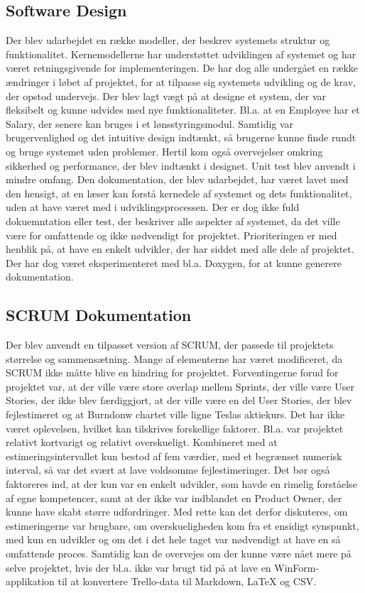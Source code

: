 \subsection{Software Design}
Der blev udarbejdet en række modeller, der beskrev systemets struktur og funktionalitet. Kernemodellerne har understøttet udviklingen af systemet og har været retningsgivende for implementeringen.
De har dog alle undergået en række ændringer i løbet af projektet, for at tilpasse sig systemets udvikling og de krav, der opstod undervejs.
Der blev lagt vægt på at designe et system, der var fleksibelt og kunne udvides med nye funktionaliteter. Bl.a. at en Employee har et Salary, der senere kan bruges i et lønsstyringsmodul.
Samtidig var brugervenlighed og det intuitive design indtænkt, så brugerne kunne finde rundt og bruge systemet uden problemer.
Hertil kom også overvejelser omkring sikkerhed og performance, der blev indtænkt i designet. Unit test blev anvendt i mindre omfang.
Den dokumentation, der blev udarbejdet, har været lavet med den hensigt, at en læser kan forstå kernedele af systemet og dets funktionalitet, uden at have været med i udviklingsprocessen.
Der er dog ikke fuld dokuemntation eller test, der beskriver alle aspekter af systemet, da det ville være for omfattende og ikke nødvendigt for projektet.
Prioriteringen er med henblik på, at have en enkelt udvikler, der har siddet med alle dele af projektet.
Der har dog været eksperimenteret med bl.a. Doxygen, for at kunne generere dokumentation.

\subsection{SCRUM Dokumentation}
Der blev anvendt en tilpasset version af SCRUM, der passede til projektets størrelse og sammensætning. Mange af elementerne har været modificeret, da SCRUM ikke måtte blive en hindring for projektet.
Forventingerne forud for projektet var, at der ville være store overlap mellem Sprints, der ville være User Stories, der ikke blev færdiggjort, at der ville være en del User Stories, der blev fejlestimeret og at Burndonw chartet ville ligne Teslas aktiekurs.
Det har ikke været oplevelsen, hvilket kan tilskrives forskellige faktorer. Bl.a. var projektet relativt kortvarigt og relativt overskueligt. 
Kombineret med at estimeringsintervallet kun bestod af fem værdier, med et begrænset numerisk interval, så var det svært at lave voldsomme fejlestimeringer. 
Det bør også faktoreres ind, at der kun var en enkelt udvikler, som havde en rimelig forståelse af egne kompetencer, samt at der ikke var indblandet en Product Owner, der kunne have skabt større udfordringer.
Med rette kan det derfor diskuteres, om estimeringerne var brugbare, om overskueligheden kom fra et ensidigt synspunkt, med kun en udvikler og om det i det hele taget var nødvendigt at have en så omfattende proces.
Samtidig kan de overvejes om der kunne være nået mere på selve projektet, hvis der bl.a. ikke var brugt tid på at lave en WinForm-applikation til at konvertere Trello-data til Markdown, LaTeX og CSV.

